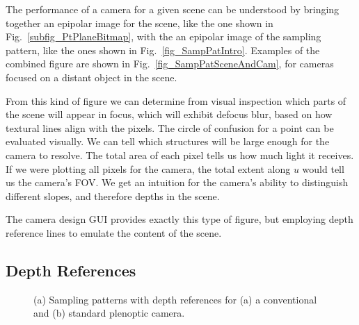 \documentclass[onecolumn]{article}
\begin{document}
The performance of a camera for a given scene can be understood by bringing together an epipolar image for the scene, like the one shown in Fig.~\ref{subfig_PtPlaneBitmap}, with the an epipolar image of the sampling pattern, like the ones shown in Fig.~\ref{fig_SampPatIntro}.  Examples of the combined figure are shown in Fig.~\ref{fig_SampPatSceneAndCam}, for cameras focused on a distant object in the scene.  

From this kind of figure we can determine from visual inspection which parts of the scene will appear in focus, which will exhibit defocus blur, based on how textural lines align with the pixels.  The circle of confusion for a point can be evaluated visually.  We can tell which structures will be large enough for the camera to resolve.  The total area of each pixel tells us how much light it receives.  If we were plotting all pixels for the camera, the total extent along $u$ would tell us the camera's \gls{FOV}.  We get an intuition for the camera's ability to distinguish different slopes, and therefore depths in the scene.

The camera design GUI provides exactly this type of figure, but employing depth reference lines to emulate the content of the scene.  


\subsection{Depth References}

\begin{figure}
	\centering
	\hfil
	\caption{(a) Sampling patterns with depth references for (a) a conventional and (b) standard plenoptic camera.}
	\label{fig_SampPatWithDepthRefs}
\end{figure}
\end{document}

